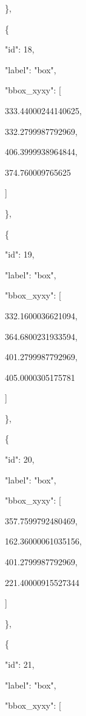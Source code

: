 \documentclass[10pt,a4paper]{article}
\begin{document}
    \},\allowbreak{}\par
    \{\par
      "id":\allowbreak{} 18,\allowbreak{}\par
      "label":\allowbreak{} "box",\allowbreak{}\par
      "bbox\_xyxy":\allowbreak{} [\par
        333.44000244140625,\allowbreak{}\par
        332.2799987792969,\allowbreak{}\par
        406.3999938964844,\allowbreak{}\par
        374.760009765625\par
      ]\par
    \},\allowbreak{}\par
    \{\par
      "id":\allowbreak{} 19,\allowbreak{}\par
      "label":\allowbreak{} "box",\allowbreak{}\par
      "bbox\_xyxy":\allowbreak{} [\par
        332.1600036621094,\allowbreak{}\par
        364.6800231933594,\allowbreak{}\par
        401.2799987792969,\allowbreak{}\par
        405.0000305175781\par
      ]\par
    \},\allowbreak{}\par
    \{\par
      "id":\allowbreak{} 20,\allowbreak{}\par
      "label":\allowbreak{} "box",\allowbreak{}\par
      "bbox\_xyxy":\allowbreak{} [\par
        357.7599792480469,\allowbreak{}\par
        162.36000061035156,\allowbreak{}\par
        401.2799987792969,\allowbreak{}\par
        221.40000915527344\par
      ]\par
    \},\allowbreak{}\par
    \{\par
      "id":\allowbreak{} 21,\allowbreak{}\par
      "label":\allowbreak{} "box",\allowbreak{}\par
      "bbox\_xyxy":\allowbreak{} [\par
\end{document}
